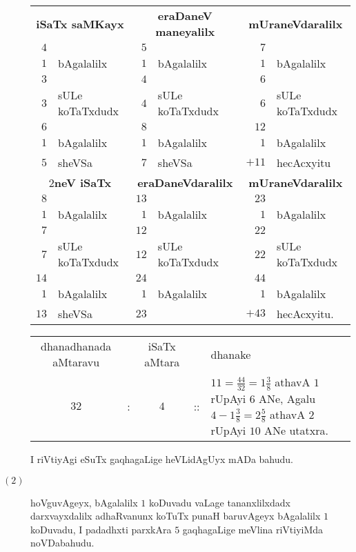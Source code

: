 \begin{description}
\begin{tabular}{rlrlrl}
     \multicolumn{2}{c}{\bf iSaTx saMKayx} & \multicolumn{2}{c}{\bf eraDaneV
     maneyalilx} & \multicolumn{2}{c}{\bf mUraneVdaralilx}\\
     $4$ && $5$ && $7$&\\
     $1$ & bAgalalilx & $1$ & bAgalalilx & $1$ & bAgalalilx \\
     \cline{1-1} \cline{3-3} \cline{5-5}
     $3$ && $4$ && $6$\\
     $3$ & sULe koTaTxdudx & $4$ & sULe koTaTxdudx & $6$ & sULe
     koTaTxdudx\\
     \cline{1-1} \cline{3-3} \cline{5-5}
     $6$ && $8$ && $12$\\
     $1$ & bAgalalilx & $1$ & bAgalalilx & $1$ & bAgalalilx\\     
     \cline{1-1} \cline{3-3} \cline{5-5}
     $5$ & sheVSa & $7$ & sheVSa & $+11$ & hecAcxyitu\\[5pt]     
     \multicolumn{2}{c}{\bf $2$neV iSaTx}
     & \multicolumn{2}{c}{\bf eraDaneVdaralilx} 
     & \multicolumn{2}{c}{\bf mUraneVdaralilx}\\
     $8$ && $13$ && $23$\\
     $1$ & bAgalalilx & $1$ & bAgalalilx & $1$ & bAgalalilx\\     
     \cline{1-1} \cline{3-3} \cline{5-5}
     $7$ && $12$ && $22$\\
     $7$ &sULe koTaTxdudx & $12$ & sULe koTaTxdudx & $22$ & sULe
     koTaTxdudx\\      
     \cline{1-1} \cline{3-3} \cline{5-5}
     $14$ && $24$ && $44$\\
     $1$ & bAgalalilx & $1$ & bAgalalilx & $1$ & bAgalalilx\\     
     \cline{1-1} \cline{3-3} \cline{5-5}
     $13$ &sheVSa & $23$ & & $+ 43$ & hecAcxyitu.
\end{tabular}

\begin{tabular}{ccccl}
      dhanadhanada aMtaravu && iSaTx aMtara & & dhanake\\
      $32$ & : & $4$ & ::
      & \multicolumn{1}{p{5.5cm}}{$11= \frac{44}{32}= 1 \frac{3}{8}$
      athavA $1$ rUpAyi $6$ ANe, Agalu $4- 1 \frac{3}{8}=2\frac{5}{8}$ athavA $2$ rUpAyi 
      $10$ ANe utatxra.}
\end{tabular}

I riVtiyAgi eSuTx gaqhagaLige heVLidAgUyx mADa bahudu.

\item[$(2)$] hoVguvAgeyx, bAgalalilx $1$ koDuvadu vaLage
      tananxlilxdadx darxvayxdalilx adhaRvanunx koTuTx punaH
      baruvAgeyx bAgalalilx $1$ koDuvadu, I padadhxti parxkAra $5$
      gaqhagaLige meVlina riVtiyiMda noVDabahudu.
\end{description}

\vskip 1cm
